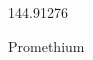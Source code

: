 \documentclass[12pt]{article}
\begin{document}
\hfill{}
\vfill
\begin{center}
  {\fontsize{50}{60}
  }

  144.91276

Promethium
\end{center}
\vfill
\end{document}
